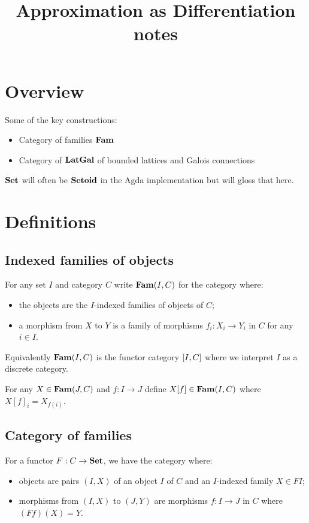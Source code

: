 \documentclass[acmsmall,nonacm]{acmart}
\begin{document}
\title{Approximation as Differentiation notes}
\maketitle

\section{Overview}

Some of the key constructions:
\begin{itemize}
\item Category of families $\mathbf{Fam}$
\item Category of $\mathbf{LatGal}$ of bounded lattices and Galois connections
\end{itemize}

\noindent $\mathbf{Set}$ will often be $\mathbf{Setoid}$ in the Agda implementation but will gloss that here.

\section{Definitions}

\subsection{Indexed families of objects}

For any set $I$ and category $C$ write $\mathbf{Fam}(I,C)$ for the category where:
\begin{itemize}
\item the objects are the $I$-indexed families of objects of $C$;
\item a morphism from $X$ to $Y$ is a family of morphisms $f_i: X_i \to Y_i$ in $C$ for any $i \in I$.
\end{itemize}

\noindent Equivalently $\mathbf{Fam}(I,C)$ is the functor category $[I,C]$ where we interpret $I$ as a discrete
category.

\begin{definition}
For any $X \in \mathbf{Fam}(J,C)$ and $f: I \to J$ define $X[f] \in \mathbf{Fam}(I,C)$ where $X[f]_i = X_{f(i)}$.
\end{definition}

\subsection{Category of families}

For a functor $F: C \to \mathbf{Set}$, we have the category where:
\begin{itemize}
\item objects are pairs $(I, X)$ of an object $I$ of $C$ and an $I$-indexed family $X \in FI$;
\item morphisms from $(I, X)$ to $(J, Y)$ are morphisms $f: I \to J$ in $C$ where $(Ff)(X) = Y$.
\end{itemize}
\end{document}
